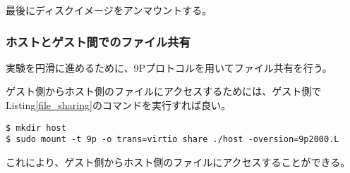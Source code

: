 \documentclass[main]{subfiles}
\begin{document}
最後にディスクイメージをアンマウントする。

\subsubsection{ホストとゲスト間でのファイル共有}

実験を円滑に進めるために、9Pプロトコルを用いてファイル共有を行う。

ゲスト側からホスト側のファイルにアクセスするためには、ゲスト側でListing\ref{file_sharing}のコマンドを実行すれば良い。

\begin{lstlisting}[label=file_sharing,caption=アクセス手順]
$ mkdir host
$ sudo mount -t 9p -o trans=virtio share ./host -oversion=9p2000.L
\end{lstlisting}

これにより、ゲスト側からホスト側のファイルにアクセスすることができる。
\end{document}

